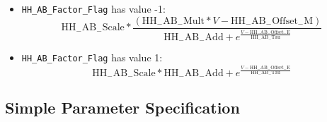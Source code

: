 \documentclass[12pt]{article}
\begin{document}
\begin{itemize}
\item {\tt HH\_AB\_Factor\_Flag} has value -1:
\begin{equation}
  \label{eq:hh-general-ff-1}
  \mathrm{HH_{-}AB_{-}Scale} * \frac{ ( \mathrm{HH_{-}AB_{-}Mult} * V - \mathrm{HH_{-}AB_{-}Offset_{-}M} ) }{ \mathrm{HH_{-}AB_{-}Add} + e ^ {\frac{ V - \mathrm{HH_{-}AB_{-}Offset_{-}E} }{ \mathrm{HH_{-}AB_{-}Tau} } } }
\end{equation}
\item {\tt HH\_AB\_Factor\_Flag} has value 1:
\begin{equation}
  \label{eq:hh-general-ff1}
  \mathrm{HH_{-}AB_{-}Scale} * \mathrm{HH_{-}AB_{-}Add} + e ^ {\frac{ V - \mathrm{HH_{-}AB_{-}Offset_{-}E} }{ \mathrm{HH_{-}AB_{-}Tau} } }
\end{equation}
\end{itemize}



\subsection{Simple Parameter Specification}
\label{sec:param-spec}
\end{document}
